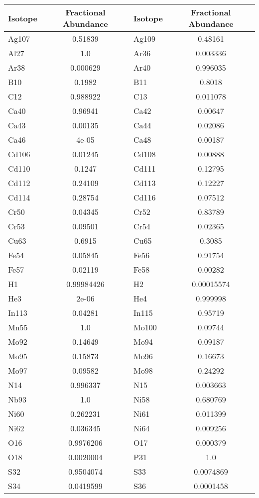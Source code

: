   \begin{longtable}{l c l c}
    \toprule
    Isotope & Fractional Abundance & Isotope & Fractional Abundance \\
    \midrule
    \midrule
Ag107 & 0.51839 & Ag109 & 0.48161 \\
Al27 & 1.0 & Ar36 & 0.003336 \\
Ar38 & 0.000629 & Ar40 & 0.996035 \\
B10 & 0.1982 & B11 & 0.8018 \\
C12 & 0.988922 & C13 & 0.011078 \\
Ca40 & 0.96941 & Ca42 & 0.00647 \\
Ca43 & 0.00135 & Ca44 & 0.02086 \\
Ca46 & 4e-05 & Ca48 & 0.00187 \\
Cd106 & 0.01245 & Cd108 & 0.00888 \\
Cd110 & 0.1247 & Cd111 & 0.12795 \\
Cd112 & 0.24109 & Cd113 & 0.12227 \\
Cd114 & 0.28754 & Cd116 & 0.07512 \\
Cr50 & 0.04345 & Cr52 & 0.83789 \\
Cr53 & 0.09501 & Cr54 & 0.02365 \\
Cu63 & 0.6915 & Cu65 & 0.3085 \\
Fe54 & 0.05845 & Fe56 & 0.91754 \\
Fe57 & 0.02119 & Fe58 & 0.00282 \\
H1 & 0.99984426 & H2 & 0.00015574 \\
He3 & 2e-06 & He4 & 0.999998 \\
In113 & 0.04281 & In115 & 0.95719 \\
Mn55 & 1.0 & Mo100 & 0.09744 \\
Mo92 & 0.14649 & Mo94 & 0.09187 \\
Mo95 & 0.15873 & Mo96 & 0.16673 \\
Mo97 & 0.09582 & Mo98 & 0.24292 \\
N14 & 0.996337 & N15 & 0.003663 \\
Nb93 & 1.0 & Ni58 & 0.680769 \\
Ni60 & 0.262231 & Ni61 & 0.011399 \\
Ni62 & 0.036345 & Ni64 & 0.009256 \\
O16 & 0.9976206 & O17 & 0.000379 \\
O18 & 0.0020004 & P31 & 1.0 \\
S32 & 0.9504074 & S33 & 0.0074869 \\
S34 & 0.0419599 & S36 & 0.0001458 \\

\end{longtable}
